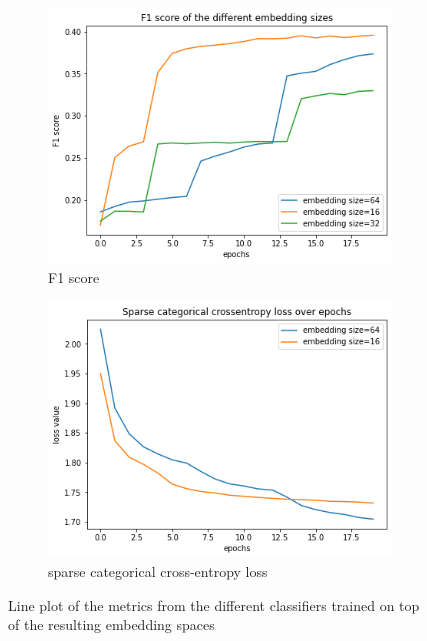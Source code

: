 \begin{figure}[t]
\centering
\begin{subfigure}{.5\linewidth}
  \centering
  \includegraphics[width=.9\linewidth]{study-doc/experiment_embedding_size/assets/classifier_f1.png}
  \caption{F1 score}
  \label{fig:embedding-size-classifier-f1}
\end{subfigure}%
\begin{subfigure}{.5\linewidth}
  \centering
  \includegraphics[width=.9\linewidth]{study-doc/experiment_embedding_size/assets/classifier_loss.png}
  \caption{sparse categorical cross-entropy loss}
  \label{fig:embedding-size-classifier-loss}
\end{subfigure}
\caption{Line plot of the metrics from the different classifiers trained on top of the resulting embedding spaces}
\label{fig:embedding-size-experiment-classifier-metrics}
\end{figure}
